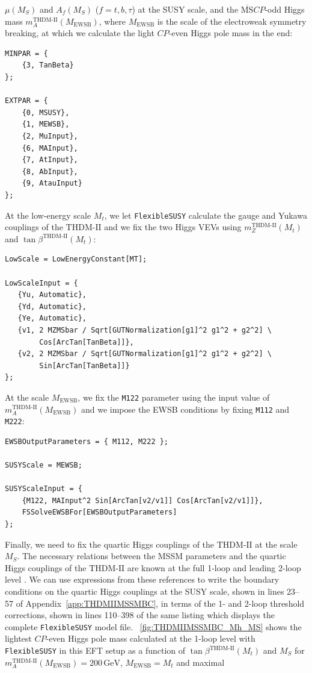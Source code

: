 \documentclass[final,3p,11pt,pdflatex]{elsarticle}
\makeatletter
\newcommand{\fs}{\texttt{FlexibleSUSY}\@\xspace}
\newcommand{\code}[1]{\lstinline|#1|}  %
\newcommand{\ol}[1]{\overline{#1}}
\newcommand{\MSbar}{\ensuremath{\ol{\text{MS}}}\xspace}
\newcommand{\unit}[1]{\,\text{#1}}      %
\newcommand{\THDMII}{\ensuremath{\text{THDM-II}}\xspace}
\newcommand{\MS}{\ensuremath{M_S}\xspace}
\newcommand{\MEWSB}{\ensuremath{M_\text{EWSB}}\xspace}
\newcommand{\figref}[1]{\figurename~\ref{#1}}
\newcommand{\appref}[1]{Appendix~\ref{#1}}
\newcommand{\CP}{\ensuremath{CP}\xspace}
\makeatother
\begin{document}
$\mu(\MS)$ and $A_f(\MS)$
($f=t,b,\tau$) at the SUSY scale, and the \MSbar \CP-odd Higgs mass
$m_A^{\THDMII}(\MEWSB)$, where \MEWSB is the scale of the electroweak
symmetry breaking, at which we calculate the light \CP-even Higgs pole mass in the
end:
%
\begin{lstlisting}
MINPAR = {
    {3, TanBeta}
};

EXTPAR = {
    {0, MSUSY},
    {1, MEWSB},
    {2, MuInput},
    {6, MAInput},
    {7, AtInput},
    {8, AbInput},
    {9, AtauInput}
};
\end{lstlisting}
%
At the low-energy scale
$M_t$, we let \fs calculate the gauge and Yukawa couplings of the
\THDMII and we fix the two Higgs VEVs using
$m_Z^{\THDMII}(M_t)$ and $\tan\beta^{\THDMII}(M_t)$:
%
\begin{lstlisting}
LowScale = LowEnergyConstant[MT];

LowScaleInput = {
   {Yu, Automatic},
   {Yd, Automatic},
   {Ye, Automatic},
   {v1, 2 MZMSbar / Sqrt[GUTNormalization[g1]^2 g1^2 + g2^2] \
        Cos[ArcTan[TanBeta]]},
   {v2, 2 MZMSbar / Sqrt[GUTNormalization[g1]^2 g1^2 + g2^2] \
        Sin[ArcTan[TanBeta]]}
};
\end{lstlisting}
%
At the scale $\MEWSB$, we fix the \code{M122} parameter using the input
value of $m_A^{\THDMII}(\MEWSB)$ and we impose the EWSB conditions by
fixing \code{M112} and \code{M222}:
%
\begin{lstlisting}
EWSBOutputParameters = { M112, M222 };

SUSYScale = MEWSB;

SUSYScaleInput = {
    {M122, MAInput^2 Sin[ArcTan[v2/v1]] Cos[ArcTan[v2/v1]]},
    FSSolveEWSBFor[EWSBOutputParameters]
};
\end{lstlisting}
%
Finally, we need to fix the quartic Higgs couplings of the \THDMII at
the scale $\MS$.  The necessary relations between the MSSM parameters
and the quartic Higgs couplings of the \THDMII are known at the full
1-loop and leading 2-loop level
\cite{Haber:1993an,Gorbahn:2009pp,Lee:2015uza}.
We can use expressions from these references to write the boundary conditions
on the quartic Higgs couplings at the SUSY scale,
shown in lines 23--57 of \appref{app:THDMIIMSSMBC},
in terms of the 1- and 2-loop threshold corrections,
shown in lines 110--398 of the same listing
which displays the complete
\fs model file.
\figref{fig:THDMIIMSSMBC_Mh_MS} shows the lightest \CP-even
Higgs pole mass calculated at the 1-loop level with \fs in this EFT
setup as a function of $\tan\beta^{\THDMII}(M_t)$ and $\MS$ for
$m_A^{\THDMII}(\MEWSB) = 200\unit{GeV}$, $\MEWSB = M_t$ and maximal
\end{document}
